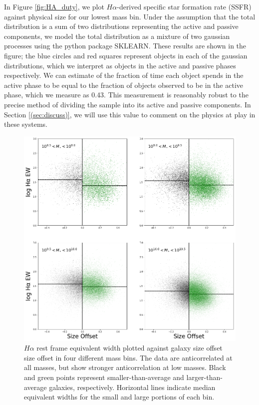 \documentclass[iop]{emulateapj}
\begin{document}
In Figure \ref{fig:HA_duty}, we plot $H\alpha$-derived specific star formation rate (SSFR) against physical size for our lowest mass bin. Under the assumption that the total distribution is a sum of two distributions representing the active and passive components, we model the total distribution as a mixture of two gaussian processes using the python package SKLEARN. These results are shown in the figure; the blue circles and red squares represent objects in each of the gaussian distributions, which we interpret as objects in the active and passive phases respectively. We can estimate of the fraction of time each object spends in the active phase to be equal to the fraction of objects observed to be in the active phase, which we measure as 0.43. This measurement is reasonably robust to the precise method of dividing the sample into its active and passive components. In Section \ref{(sec:discuss)}, we will use this value to comment on the physics at play in these systems.

\begin{figure}
	\centering
	\includegraphics[width=1.5 \columnwidth]{ha_ew_2x2.png}
	\caption{$H\alpha$ rest frame equivalent width plotted against galaxy size offset size offset in four different mass bins. The data are anticorrelated at all masses, but show stronger anticorrelation at low masses. Black and green points represent smaller-than-average and larger-than-average galaxies, respectively. Horizontal lines indicate median equivalent widths for the small and large portions of each bin. }
	\label{fig:HA_ew}
	
\end{figure}
\end{document}

